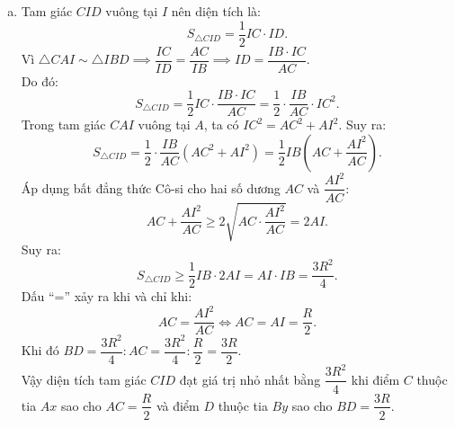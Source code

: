 \begin{bt}
{\begin{enumerate}[a)]
	$$IB = AB - AI = 2R - \dfrac{R}{2} = \dfrac{3R}{2}.$$
	Suy ra:
	$$AC \cdot BD = \dfrac{R}{2} \cdot \dfrac{3R}{2} = \dfrac{3R^2}{4}.$$
	Vì $R$ không đổi nên tích $AC \cdot BD$ không đổi.
	\item Tam giác $CID$ vuông tại $I$ nên diện tích là:
	$$S_{\triangle CID} = \dfrac{1}{2} IC \cdot ID.$$
	Vì $\triangle CAI \sim \triangle IBD \implies \dfrac{IC}{ID} = \dfrac{AC}{IB} \implies ID = \dfrac{IB \cdot IC}{AC}$.\\
	Do đó:
	$$S_{\triangle CID} = \dfrac{1}{2} IC \cdot \dfrac{IB \cdot IC}{AC} = \dfrac{1}{2} \cdot \dfrac{IB}{AC} \cdot IC^2.$$
	Trong tam giác $CAI$ vuông tại $A$, ta có $IC^2 = AC^2 + AI^2$. Suy ra:
	$$S_{\triangle CID} = \dfrac{1}{2} \cdot \dfrac{IB}{AC} (AC^2 + AI^2) = \dfrac{1}{2} IB \left(AC + \dfrac{AI^2}{AC}\right).$$
	Áp dụng bất đẳng thức Cô-si cho hai số dương $AC$ và $\dfrac{AI^2}{AC}$:
	$$AC + \dfrac{AI^2}{AC} \ge 2\sqrt{AC \cdot \dfrac{AI^2}{AC}} = 2AI.$$
	Suy ra:
	$$S_{\triangle CID} \ge \dfrac{1}{2} IB \cdot 2AI = AI \cdot IB = \dfrac{3R^2}{4}.$$
	Dấu ``='' xảy ra khi và chỉ khi:
	$$AC = \dfrac{AI^2}{AC} \iff AC = AI = \dfrac{R}{2}.$$
	Khi đó $BD = \dfrac{3R^2}{4} : AC = \dfrac{3R^2}{4} : \dfrac{R}{2} = \dfrac{3R}{2}$.\\
	Vậy diện tích tam giác $CID$ đạt giá trị nhỏ nhất bằng $\dfrac{3R^2}{4}$ khi điểm $C$ thuộc tia $Ax$ sao cho $AC = \dfrac{R}{2}$ và điểm $D$ thuộc tia $By$ sao cho $BD = \dfrac{3R}{2}$.
\end{enumerate}
}
\end{bt}

